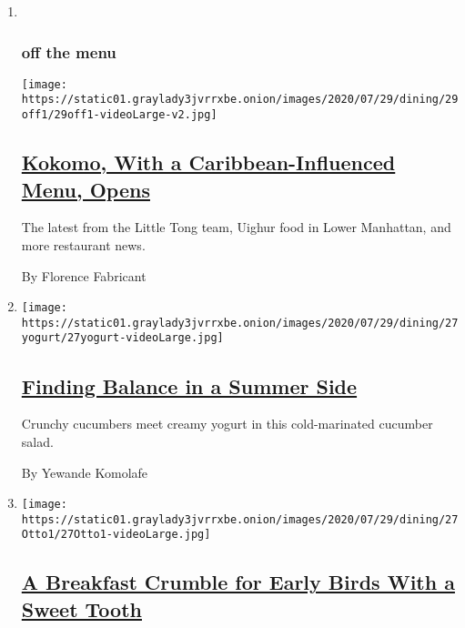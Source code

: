 \begin{enumerate}
\def\labelenumi{\arabic{enumi}.}
\item ~
  \hypertarget{off-the-menu}{%
  \subsubsection{off the menu}\label{off-the-menu}}

  \texttt{[image: https://static01.graylady3jvrrxbe.onion/images/2020/07/29/dining/29off1/29off1-videoLarge-v2.jpg]}

  \hypertarget{kokomo-with-a-caribbean-influenced-menu-opens}{%
  \subsection{\texorpdfstring{\href{/2020/07/28/dining/nyc-restaurant-news.html}{Kokomo,
  With a Caribbean-Influenced Menu,
  Opens}}{Kokomo, With a Caribbean-Influenced Menu, Opens}}\label{kokomo-with-a-caribbean-influenced-menu-opens}}

  The latest from the Little Tong team, Uighur food in Lower Manhattan,
  and more restaurant news.

  By Florence Fabricant
\item
  \texttt{[image: https://static01.graylady3jvrrxbe.onion/images/2020/07/29/dining/27yogurt/27yogurt-videoLarge.jpg]}

  \hypertarget{finding-balance-in-a-summer-side}{%
  \subsection{\texorpdfstring{\href{/2020/07/27/dining/cucumbers-yogurt-recipe.html}{Finding
  Balance in a Summer
  Side}}{Finding Balance in a Summer Side}}\label{finding-balance-in-a-summer-side}}

  Crunchy cucumbers meet creamy yogurt in this cold-marinated cucumber
  salad.

  By Yewande Komolafe
\item
  \texttt{[image: https://static01.graylady3jvrrxbe.onion/images/2020/07/29/dining/27Otto1/27Otto1-videoLarge.jpg]}

  \hypertarget{a-breakfast-crumble-for-early-birds-with-a-sweet-tooth}{%
  \subsection{\texorpdfstring{\href{/2020/07/27/dining/breakfast-crumble-recipe.html}{A
  Breakfast Crumble for Early Birds With a Sweet
  Tooth}}{A Breakfast Crumble for Early Birds With a Sweet Tooth}}\label{a-breakfast-crumble-for-early-birds-with-a-sweet-tooth}}


\end{enumerate}
